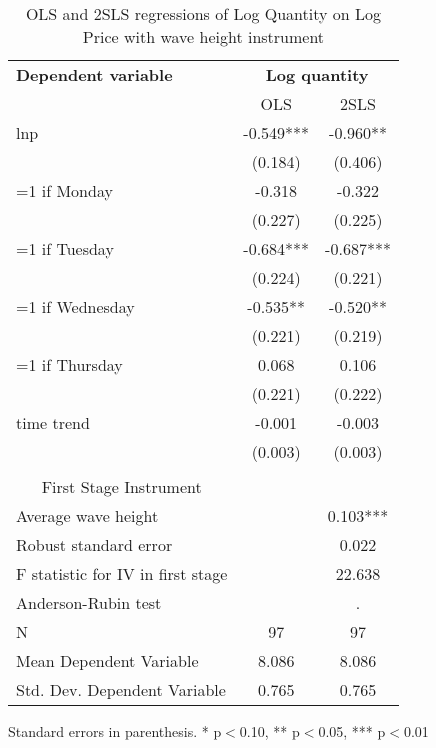 \begin{table}[htbp]\centering
\scriptsize
\caption{OLS and 2SLS regressions of Log Quantity on Log Price with wave height instrument}
\label{2sls_2}
\begin{center}
\begin{threeparttable}
\begin{tabular}{l*{2}{c}}
\toprule
\multicolumn{1}{l}{\textbf{Dependent variable}}&
\multicolumn{2}{c}{\textbf{Log quantity}}\\
\multicolumn{1}{c}{}&
\multicolumn{1}{c}{OLS}&
\multicolumn{1}{c}{2SLS}\\
\midrule
lnp                 &      -0.549***&      -0.960** \\
                    &     (0.184)   &     (0.406)   \\
=1 if Monday        &      -0.318   &      -0.322   \\
                    &     (0.227)   &     (0.225)   \\
=1 if Tuesday       &      -0.684***&      -0.687***\\
                    &     (0.224)   &     (0.221)   \\
=1 if Wednesday     &      -0.535** &      -0.520** \\
                    &     (0.221)   &     (0.219)   \\
=1 if Thursday      &       0.068   &       0.106   \\
                    &     (0.221)   &     (0.222)   \\
time trend          &      -0.001   &      -0.003   \\
                    &     (0.003)   &     (0.003)   \\
\\
\midrule
\multicolumn{1}{c}{First Stage Instrument}\\
Average wave height &               &       0.103***\\
Robust standard error &               &       0.022   \\
F statistic for IV in first stage&               &      22.638   \\
Anderson-Rubin test &               &           .   \\
N                   &          97   &          97   \\
Mean Dependent Variable&       8.086   &       8.086   \\
Std. Dev. Dependent Variable&       0.765   &       0.765   \\
\bottomrule
\end{tabular}
\begin{tablenotes}
\tiny
\item Standard errors in parenthesis. * p$<$0.10, ** p$<$0.05, *** p$<$0.01
\end{tablenotes}
\end{threeparttable}
\end{center}
\end{table}
